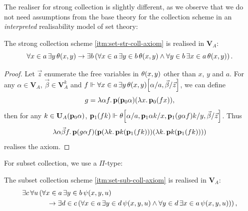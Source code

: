 \documentclass[12pt,openany]{book}
\theoremstyle{plain}
\theoremstyle{definition}
\newcommand\opA[1]{\mathop{\forall #1}}
\newcommand\opE[1]{\mathop{\exists #1}}
\newcommand\oplam[1]{\mathop{\lambda #1.}}
\newcommand\bp{\mathbf{p}}
\newcommand\bU{\mathbf{U}}
\newcommand\bV{\mathbf{V}}
\begin{document}
The realiser for strong collection is slightly different, as we observe that we do not need assumptions from the base theory for the collection scheme in an \emph{interpreted} realisability model of set theory:
\begin{lemma}
  The strong collection scheme \ref{itm:set-str-coll-axiom} is realised in $\bV_A$:
  \[\opA{x \in a} \opE{y} \theta\mleft(x, y\mright) \rightarrow \opE{b} \left(\opA{x \in a} \opE{y \in b} \theta\mleft(x, y\mright) \land \opA{y \in b} \opE{x \in a} \theta\mleft(x, y\mright)\right).\]
\end{lemma}

\begin{proof}
  Let $\vec{z}$ enumerate the free variables in $\theta\mleft(x, y\mright)$ other than $x$, $y$ and $a$. For any $\alpha \in \bV_A$, $\vec{\beta} \in \bV_A^k$ and $f \Vdash \opA{x \in a} \opE{y} \theta\mleft(x, y\mright)\mleft[\alpha/a, \vec{\beta}/\vec{z}\mright]$, we can define
  \[g = \oplam{\alpha f} \bp \mleft(\bp_0 \alpha\mright) \mleft(\oplam{x} \bp_0 \mleft(fx\mright)\mright),\]
  then for any $k \in \bU_A\mleft(\bp_0 \alpha\mright)$, $\bp_1 \mleft(fk\mright) \Vdash \theta\mleft[\alpha/a, \bp_1 \alpha k/x, \bp_1 \mleft(g \alpha f\mright) k/y, \vec{\beta}/\vec{z}\mright]$. Thus
  \[\oplam{\alpha \vec{\beta} f} \bp \mleft(g \alpha f\mright) \mleft(\bp \mleft(\oplam{k} \bp k \mleft(\bp_1 \mleft(fk\mright)\mright)\mright) \mleft(\oplam{k} \bp k \mleft(\bp_1 \mleft(fk\mright)\mright)\mright)\mright)\]
  realises the axiom.
\end{proof}

For subset collection, we use a $\Pi$-type:
\begin{lemma}
  The subset collection scheme \ref{itm:set-sub-coll-axiom} is realised in $\bV_A$:
  \begin{align*}
    \opE{c} \opA{u} & \left(\opA{x \in a} \opE{y \in b} \psi\mleft(x, y, u\mright)\right.                                                                                                               \\
                    & \quad \left.{} \rightarrow \opE{d \in c} \left(\opA{x \in a} \opE{y \in d} \psi\mleft(x, y, u\mright) \land \opA{y \in d} \opE{x \in a} \psi\mleft(x, y, u\mright)\right)\right),
  \end{align*}
\end{lemma}
\end{document}
